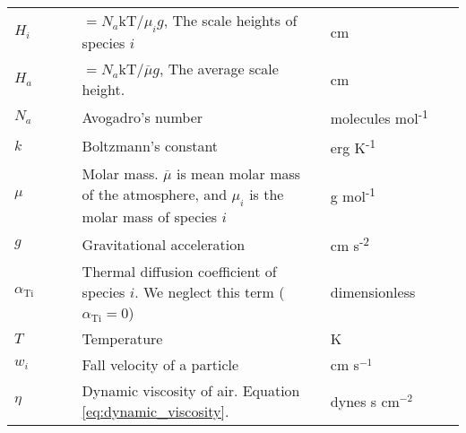 \begin{table}
\begin{tabularx}{\linewidth}{p{0.15\linewidth} | p{0.55\linewidth} | p{0.3\linewidth}}
  \(H_{i}\) & \(= N_{a}\text{kT}\text{/}\mu_{i}g\), The scale heights of
  species \(i\) & cm \\
  \(H_{a}\) & \(= N_{a}\text{kT}\text{/}\overline{\mu}g\), The average
  scale height. & cm \\
  \(N_{a}\) & Avogadro's number & molecules
  mol\textsuperscript{-1} \\
  \(k\) & Boltzmann's constant & erg K\textsuperscript{-1} \\
  \(\mu\) & Molar mass. \(\overline{\mu}\) is mean molar mass of the
  atmosphere, and \(\mu_{i}\) is the molar mass of species \(i\) & g
  mol\textsuperscript{-1} \\
  \(g\) & Gravitational acceleration & cm
  s\textsuperscript{-2} \\
  \(\alpha_{\text{Ti}}\) & Thermal diffusion coefficient of species \(i\).
  We neglect this term (\(\alpha_{\text{Ti}} = 0\)) &
  dimensionless \\
  \(T\) & Temperature & K \\
  $w_i$ & Fall velocity of a particle & cm s$^{-1}$ \\
  $\eta$ & Dynamic viscosity of air. Equation \eqref{eq:dynamic_viscosity}. & dynes s cm$^{-2}$ \\
  \end{tabularx}
\end{table}